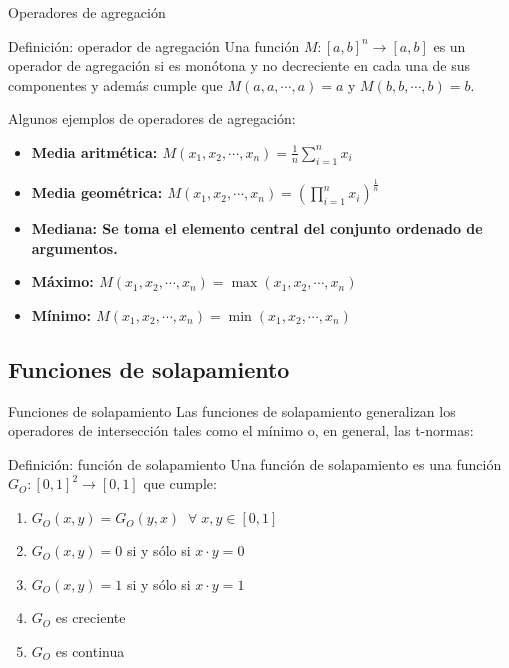 \documentclass{beamer}
\begin{document}
\begin{frame}{Operadores de agregación}
	\begin{block}{Definición: operador de agregación}
	Una función $M : [a,b]^{n} \rightarrow [a,b]$ es un operador de agregación si es monótona y no decreciente en cada una de sus componentes y además cumple que $M(a, a, \cdots,a) = a$ y $M(b, b, \cdots,b) = b$.
	\end{block}
	Algunos ejemplos de operadores de agregación:
	\begin{itemize}
		\item \bfseries Media aritmética: $M(x_{1},x_{2},\cdots,x_{n}) = \frac{1}{n}\sum\limits_{i=1}^{n}x_{i}$
		\item \bfseries Media geométrica: $M(x_{1},x_{2},\cdots,x_{n}) = (\prod\limits_{i=1}^{n}x_{i})^{\frac{1}{n}}$
		\item \bfseries Mediana: \normalfont Se toma el elemento central del conjunto ordenado de argumentos.
		\item \bfseries Máximo: $M(x_{1},x_{2},\cdots,x_{n}) = \max(x_{1},x_{2},\cdots,x_{n})$
		\item \bfseries Mínimo: $M(x_{1},x_{2},\cdots,x_{n}) = \min(x_{1},x_{2},\cdots,x_{n})$
	\end{itemize}
\end{frame}

\subsection{Funciones de solapamiento}
\begin{frame}{Funciones de solapamiento}
Las funciones de solapamiento generalizan los operadores de intersección tales como el mínimo o, en general, las t-normas:
	\begin{block}{Definición: función de solapamiento}
	Una función de solapamiento es una función $G_{O} : [0,1]^{2} \rightarrow [0,1]$ que cumple:
	\begin{enumerate}
	   \item $G_{O}(x,y) = G_{O}(y,x) \;\; \forall \; x,y \in [0,1]$ 
	   \item $G_{O}(x,y) = 0$ si y sólo si $x \cdot y = 0$
	   \item $G_{O}(x,y) = 1$ si y sólo si $x \cdot y = 1$
	   \item $G_{O}$ es creciente
	   \item $G_{O}$ es continua
	\end{enumerate}
	\end{block}
\end{frame}
\end{document}
